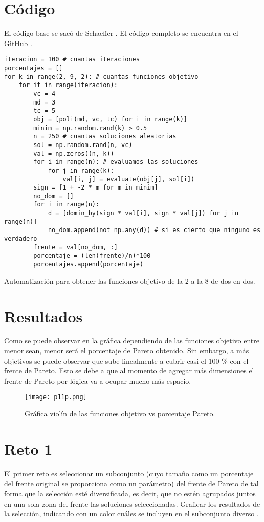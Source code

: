 \documentclass{article}
\begin{document}
\newpage
\section{Código}
El código base se sacó de Schaeffer \cite{Elisa_Schaeffer}. El código completo se encuentra en el GitHub \cite{Denisse_Leyva}.

\renewcommand{\listingscaption}{Código}
\begin{listing}[H]
  \begin{verbatim}
iteracion = 100 # cuantas iteraciones
porcentajes = []
for k in range(2, 9, 2): # cuantas funciones objetivo
    for it in range(iteracion): 
        vc = 4
        md = 3
        tc = 5
        obj = [poli(md, vc, tc) for i in range(k)]
        minim = np.random.rand(k) > 0.5
        n = 250 # cuantas soluciones aleatorias
        sol = np.random.rand(n, vc)
        val = np.zeros((n, k))
        for i in range(n): # evaluamos las soluciones
            for j in range(k):
                val[i, j] = evaluate(obj[j], sol[i])
        sign = [1 + -2 * m for m in minim]
        no_dom = []
        for i in range(n):
            d = [domin_by(sign * val[i], sign * val[j]) for j in range(n)]
            no_dom.append(not np.any(d)) # si es cierto que ninguno es verdadero
        frente = val[no_dom, :]
        porcentaje = (len(frente)/n)*100
        porcentajes.append(porcentaje)
      \end{verbatim}
  \label{lst:fibo}
  \caption{Automatización para obtener las funciones objetivo de la 2 a la 8 de dos en dos.}
\end{listing}

\section{Resultados}
Como se puede observar en la gráfica dependiendo de las funciones objetivo entre menor sean, menor será el porcentaje de Pareto obtenido.
Sin embargo, a más objetivos se puede observar que sube linealmente a cubrir casi el 100 $\%$ con el frente de Pareto. Esto se debe a que al momento de agregar más dimensiones el frente de Pareto por lógica va a ocupar mucho más espacio.

\begin{figure}[H]
\centering
\texttt{[image: p11p.png]}
\caption{\label{fig3} Gráfica violín de las funciones objetivo vs porcentaje Pareto.}
\end{figure}

\section{Reto 1}
El primer reto es seleccionar un subconjunto (cuyo tamaño como un porcentaje del frente original se proporciona como un parámetro) del frente de Pareto de tal forma que la selección esté diversificada, es decir, que no estén agrupados juntos en una sola zona del frente las soluciones seleccionadas. Graficar los resultados de la selección, indicando con un color cuáles se incluyen en el subconjunto diverso \cite{Satu_Elisa_Schaeffer}.

\printbibliography
\end{document}
